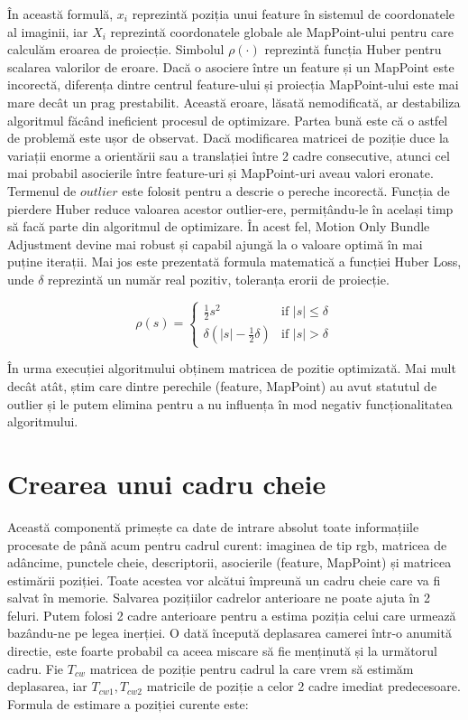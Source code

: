 \documentclass[12pt,a4paper]{report}
\begin{document}
În această formulă, \(x_i\) reprezintă poziția unui feature în sistemul de 
coordonatele al imaginii, iar \(X_i\) reprezintă coordonatele globale ale MapPoint-ului pentru care calculăm eroarea
de proiecție. Simbolul $ \rho(\cdot) $ reprezintă funcția Huber\cite{huber1964} pentru scalarea valorilor de eroare.
Dacă o asociere între un feature și un MapPoint este incorectă, diferența dintre centrul feature-ului
și proiecția MapPoint-ului este mai mare decât un prag prestabilit. Această eroare, lăsată nemodificată,
ar destabiliza algoritmul făcând ineficient procesul de optimizare. Partea bună este că o astfel de problemă
este ușor de observat. Dacă modificarea matricei de poziție duce la variații enorme a orientării sau a translației
între 2 cadre consecutive, atunci cel mai probabil asocierile între feature-uri și MapPoint-uri aveau valori eronate. 
Termenul de \(outlier\) este folosit pentru a descrie o pereche incorectă. Funcția de pierdere Huber reduce 
valoarea acestor outlier-ere, permițându-le în același timp să facă parte din algoritmul de 
optimizare. În acest fel, Motion Only Bundle Adjustment devine mai robust și capabil ajungă la o valoare optimă 
în mai puține iterații. Mai jos este prezentată formula matematică a funcției Huber Loss, 
unde $ \delta $ reprezintă un număr real pozitiv, toleranța erorii de proiecție. 

\begin{equation}
\rho(s) =
\begin{cases}
\frac{1}{2}s^2 & \text{if } |s| \leq \delta \\
\delta (|s| - \frac{1}{2}\delta) & \text{if } |s| > \delta
\end{cases}
\end{equation}

În urma execuției algoritmului obținem matricea de pozitie optimizată. Mai mult decât atât,
știm care dintre perechile (feature, MapPoint) au avut statutul de outlier și le putem 
elimina pentru a nu influența în mod negativ funcționalitatea algoritmului.

\section{Crearea unui cadru cheie}
Această componentă primește ca date de intrare absolut toate informațiile procesate de 
până acum pentru cadrul curent: imaginea de tip rgb, matricea de adâncime, punctele cheie,
descriptorii, asocierile (feature, MapPoint) și matricea estimării poziției. 
Toate acestea vor alcătui împreună un cadru cheie care va fi salvat în memorie.
Salvarea pozițiilor cadrelor anterioare ne poate ajuta în 2 feluri. Putem folosi 2 
cadre anterioare pentru a estima poziția celui care urmează bazându-ne pe legea inerției. 
O dată începută deplasarea camerei într-o anumită directie, este foarte 
probabil ca aceea miscare să fie menținută și la următorul cadru. Fie \(T_{cw}\) matricea de 
poziție pentru cadrul la care vrem să estimăm deplasarea, iar \(T_{cw1}, T_{cw2} \) matricile 
de poziție a celor 2 cadre imediat predecesoare. Formula de estimare a poziției curente este:
\end{document}
